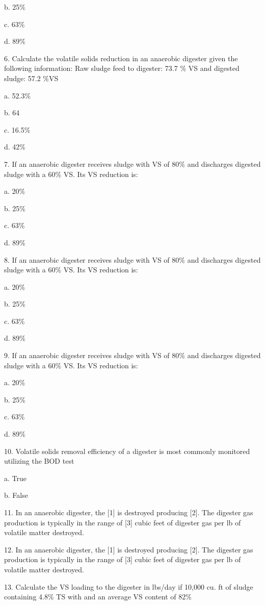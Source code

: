 \documentclass{article}
\begin{document}
b. 25\% 

c. 63\% 

d. 89\% 


6. Calculate the volatile solids reduction in an anaerobic digester given the following information: Raw sludge feed to digester: 73.7 \% VS and digested sludge: 57.2 \%VS

a. 52.3\% 

b. 64 

c. 16.5\% 

d. 42\% 


7. If an anaerobic digester receives sludge with VS of 80\% and discharges digested sludge with a 60\% VS. Its VS reduction is:

a. 20\% 

b. 25\% 

c. 63\% 

d. 89\% 


8. If an anaerobic digester receives sludge with VS of 80\% and discharges digested sludge with a 60\% VS. Its VS reduction is:

a. 20\% 

b. 25\% 

c. 63\% 

d. 89\% 


9. If an anaerobic digester receives sludge with VS of 80\% and discharges digested sludge with a 60\% VS. Its VS reduction is:

a. 20\% 

b. 25\% 

c. 63\% 

d. 89\% 


10. Volatile solids removal efficiency of a digester is most commonly monitored utilizing the BOD test

a. True 

b. False 


11. In an anaerobic digester, the [1] is destroyed producing [2]. The digester gas production is typically in the range of [3] cubic feet of digester gas per lb of volatile matter destroyed. 


12. In an anaerobic digester, the [1] is destroyed producing [2]. The digester gas production is typically in the range of [3] cubic feet of digester gas per lb of volatile matter destroyed. 


13. Calculate the VS loading to the digester in lbs/day if 10,000 cu. ft of sludge containing 4.8\% TS with and an average VS content of 82\% 
\end{document}
